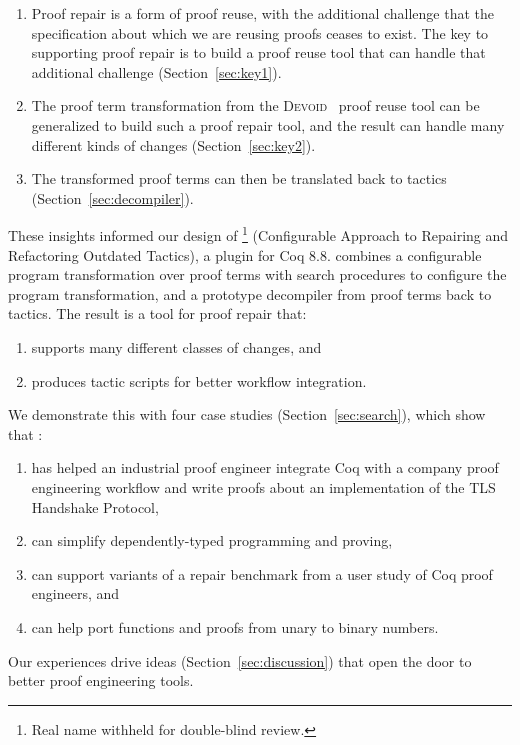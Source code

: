\begin{enumerate}
\item Proof repair is a form of proof reuse, with the additional
challenge that the specification about which
we are reusing proofs ceases to exist.
The key to supporting proof repair is to build a proof reuse
tool that can handle that additional challenge (Section~\ref{sec:key1}). 
\item The proof term transformation from the \textsc{Devoid}~\cite{Ringer2019} proof reuse tool can be generalized
to build such a proof repair tool, and the result can handle many different kinds of changes (Section~\ref{sec:key2}).
\item The transformed proof terms can then be translated back to tactics (Section~\ref{sec:decompiler}).
\end{enumerate}

These insights informed our design of 
\toolname\footnote{Real name withheld for double-blind review.} (Configurable Approach to Repairing and Refactoring Outdated Tactics), a plugin for Coq 8.8.
\toolname combines a configurable program transformation over proof terms %
with search procedures to configure the program transformation,
and a prototype decompiler from proof terms back to tactics.
The result is a tool for proof repair that:

\begin{enumerate}
\item supports many different classes of changes, and
\item produces tactic scripts for better workflow integration.
\end{enumerate}
We demonstrate this with four case studies (Section~\ref{sec:search}), which show that \toolname:

\begin{enumerate}
\item has helped an industrial proof engineer integrate Coq with a company proof engineering workflow and write proofs about an implementation
of the TLS Handshake Protocol,
\item can simplify dependently-typed programming and proving,
\item can support variants of a repair benchmark from a user study of Coq proof engineers, and
\item can help port functions and proofs from unary to binary numbers.
\end{enumerate}
Our experiences drive ideas (Section~\ref{sec:discussion}) that open the door to better proof engineering tools.


